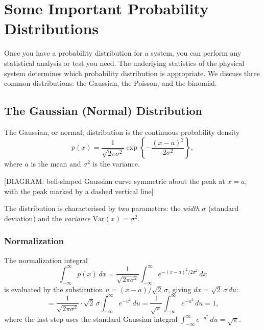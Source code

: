 \chapter{Some Important Probability Distributions}

Once you have a probability distribution for a system, you can perform any statistical analysis or test you need. The underlying statistics of the physical system determines which probability distribution is appropriate. We discuss three common distributions: the Gaussian, the Poisson, and the binomial.

\section{The Gaussian (Normal) Distribution}

\begin{definition}
The Gaussian, or normal, distribution is the continuous probability density
\begin{equation}
    p(x) = \frac{1}{\sqrt{2\pi\sigma^2}}\exp\!\left\{-\frac{(x-a)^2}{2\sigma^2}\right\},
\end{equation}
where $a$ is the mean and $\sigma^2$ is the variance.
\end{definition}

\begin{center}[DIAGRAM: bell-shaped Gaussian curve symmetric about the peak at $x = a$, with the peak marked by a dashed vertical line]\end{center}

The distribution is characterised by two parameters: the \emph{width} $\sigma$ (standard deviation) and the \emph{variance} $\mathrm{Var}(x) = \sigma^2$.

\subsection{Normalization}

The normalization integral
\begin{equation}
    \int_{-\infty}^{\infty} p(x)\,dx = \frac{1}{\sqrt{2\pi\sigma^2}} \int_{-\infty}^{\infty} e^{-(x-a)^2/2\sigma^2}\,dx
\end{equation}
is evaluated by the substitution $u = (x-a)/\sqrt{2}\,\sigma$, giving $dx = \sqrt{2}\,\sigma\,du$:
\begin{equation}
    = \frac{1}{\sqrt{2\pi\sigma^2}}\cdot\sqrt{2}\,\sigma \int_{-\infty}^{\infty} e^{-u^2}\,du
    = \frac{1}{\sqrt{\pi}}\int_{-\infty}^{\infty} e^{-u^2}\,du = 1,
\end{equation}
where the last step uses the standard Gaussian integral $\int_{-\infty}^{\infty} e^{-u^2}\,du = \sqrt{\pi}$.

